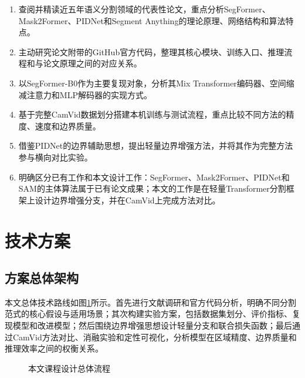 \documentclass{report}
\begin{document}
\begin{enumerate}
    \item 查阅并精读近五年语义分割领域的代表性论文，重点分析SegFormer、Mask2Former、PIDNet和Segment Anything的理论原理、网络结构和算法特点。
    \item 主动研究论文附带的GitHub官方代码，整理其核心模块、训练入口、推理流程和与论文原理之间的对应关系。
    \item 以SegFormer-B0作为主要复现对象，分析其Mix Transformer编码器、空间缩减注意力和MLP解码器的实现方式。
    \item 基于完整CamVid数据划分搭建本机训练与测试流程，重点比较不同方法的精度、速度和边界质量。
    \item 借鉴PIDNet的边界辅助思想，提出轻量边界增强方法，并将其作为完整方法参与横向对比实验。
    \item 明确区分已有工作和本文设计工作：SegFormer、Mask2Former、PIDNet和SAM的主体算法属于已有论文成果；本文的工作是在轻量Transformer分割框架上设计边界增强分支，并在CamVid上完成方法对比。
\end{enumerate}

\section{技术方案}

\subsection{方案总体架构}

本文总体技术路线如图\ref{fig:pipeline}所示。首先进行文献调研和官方代码分析，明确不同分割范式的核心假设与适用场景；其次构建实验方案，包括数据集划分、评价指标、复现模型和改进模型；然后围绕边界增强思想设计轻量分支和联合损失函数；最后通过CamVid方法对比、消融实验和定性可视化，分析模型在区域精度、边界质量和推理效率之间的权衡关系。

\begin{figure}[H]
\centering
{}
\caption{本文课程设计总体流程}
\label{fig:pipeline}
\end{figure}
\end{document}
